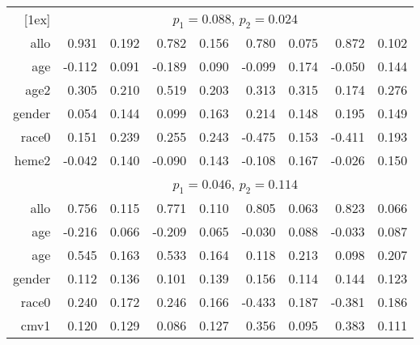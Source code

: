 \documentclass[a4paper,10pt]{article}
\begin{document}
\begin{table}[ht]
\begin{tabular}{rrrrrrrrr}
    [1ex]
    & \multicolumn{8}{c}{$p_1 = 0.088$, $p_2 = 0.024$}\\
    allo & 0.931 & 0.192 & 0.782 & 0.156 & 0.780 & 0.075 & 0.872 & 0.102 \\ 
  age & -0.112 & 0.091 & -0.189 & 0.090 & -0.099 & 0.174 & -0.050 & 0.144 \\ 
  age2 & 0.305 & 0.210 & 0.519 & 0.203 & 0.313 & 0.315 & 0.174 & 0.276 \\ 
  gender & 0.054 & 0.144 & 0.099 & 0.163 & 0.214 & 0.148 & 0.195 & 0.149 \\ 
  race0 & 0.151 & 0.239 & 0.255 & 0.243 & -0.475 & 0.153 & -0.411 & 0.193 \\ 
  heme2 & -0.042 & 0.140 & -0.090 & 0.143 & -0.108 & 0.167 & -0.026 & 0.150 \\ 
    [1ex]
    & \multicolumn{8}{c}{$p_1 = 0.046$, $p_2 = 0.114$}\\
    allo & 0.756 & 0.115 & 0.771 & 0.110 & 0.805 & 0.063 & 0.823 & 0.066 \\ 
  age & -0.216 & 0.066 & -0.209 & 0.065 & -0.030 & 0.088 & -0.033 & 0.087 \\ 
  age & 0.545 & 0.163 & 0.533 & 0.164 & 0.118 & 0.213 & 0.098 & 0.207 \\ 
  gender & 0.112 & 0.136 & 0.101 & 0.139 & 0.156 & 0.114 & 0.144 & 0.123 \\ 
  race0 & 0.240 & 0.172 & 0.246 & 0.166 & -0.433 & 0.187 & -0.381 & 0.186 \\ 
  cmv1 & 0.120 & 0.129 & 0.086 & 0.127 & 0.356 & 0.095 & 0.383 & 0.111 \\ 
    \bottomrule
  \end{tabular}
\end{table}
\end{document}
